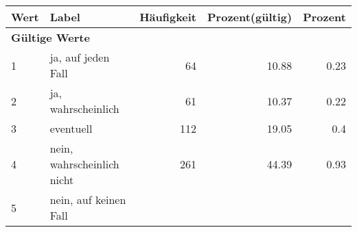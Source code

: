      \begin{longtable}{lXrrr}
     \toprule
     \textbf{Wert} & \textbf{Label} & \textbf{Häufigkeit} & \textbf{Prozent(gültig)} & \textbf{Prozent} \\
     \endhead
     \midrule
     \multicolumn{5}{l}{\textbf{Gültige Werte}}\\

     1 &
     \multicolumn{1}{X}{ ja, auf jeden Fall   } &


       \num{64} &
       \num[round-mode=places,round-precision=2]{10,88} &
         \num[round-mode=places,round-precision=2]{0,23} \\

     2 &
     \multicolumn{1}{X}{ ja, wahrscheinlich   } &


       \num{61} &
       \num[round-mode=places,round-precision=2]{10,37} &
         \num[round-mode=places,round-precision=2]{0,22} \\

     3 &
     \multicolumn{1}{X}{ eventuell   } &


       \num{112} &
       \num[round-mode=places,round-precision=2]{19,05} &
         \num[round-mode=places,round-precision=2]{0,4} \\

     4 &
     \multicolumn{1}{X}{ nein, wahrscheinlich nicht   } &


       \num{261} &
       \num[round-mode=places,round-precision=2]{44,39} &
         \num[round-mode=places,round-precision=2]{0,93} \\

     5 &
     \multicolumn{1}{X}{ nein, auf keinen Fall   } &



\end{longtable}
